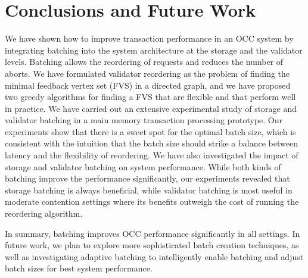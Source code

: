 \section{Conclusions and Future Work}\label{sec:conclusion}
We have shown how to improve transaction performance in an OCC system by integrating batching into the system architecture at the storage and the validator levels. Batching allows the reordering of requests and reduces the number of aborts. We have formulated validator reordering as the problem of finding the minimal feedback vertex set (FVS) in a directed graph, and we have proposed two greedy algorithms for finding a FVS that are flexible and that perform well in practice. We have carried out an extensive experimental study of storage and validator batching in a main memory transaction processing prototype. Our experiments show that there is a sweet spot for the optimal batch size, which is consistent with the intuition that the batch size should strike a balance between latency and the flexibility of reordering. We have also investigated the impact of storage and validator batching on system performance. While both kinds of batching improve the performance significantly, our experiments revealed that storage batching is always beneficial, while validator batching is most useful in moderate contention settings where its benefits outweigh the cost of running the reordering algorithm.

In summary, batching improves OCC performance significantly in all settings. In future work, we plan to explore more sophisticated batch creation techniques, as well as investigating adaptive batching to intelligently enable batching and adjust batch sizes for best system performance.


